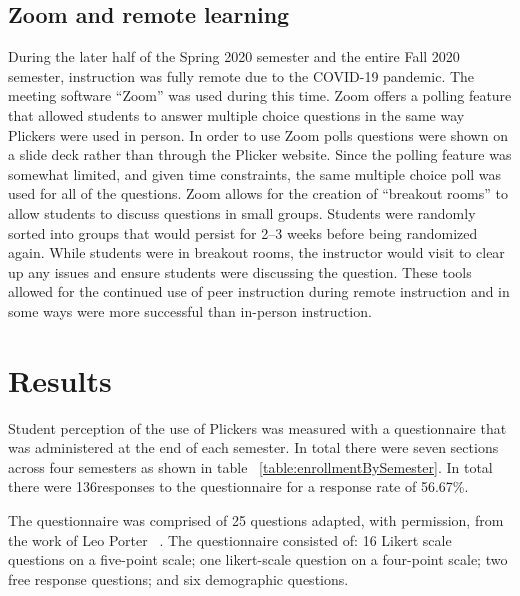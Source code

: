 \documentclass[12pt]{article}
\newcommand\sampleSize{136}
\begin{document}
\subsection{Zoom and remote learning}
During the later half of the Spring 2020 semester and the entire Fall 2020 semester, instruction was fully remote due to the COVID-19 pandemic. The meeting software ``Zoom''  was used during this time. Zoom offers a polling feature that allowed students to answer multiple choice questions in the same way Plickers were used in person. In order to use Zoom polls questions were shown on a slide deck rather than through the Plicker website. Since the polling feature was somewhat limited, and given time constraints, the same multiple choice poll was used for all of the questions. 
Zoom allows for the creation of ``breakout rooms'' to allow students to discuss questions in small groups. Students were randomly sorted into groups that would persist for 2–3 weeks before being randomized again. While students were in breakout rooms, the instructor would visit to clear up any issues and ensure students were discussing the question. These tools allowed for the continued use of peer instruction during remote instruction and in some ways were more successful than in-person instruction.

\section{Results}

Student perception of the use of Plickers was measured with a questionnaire that was administered at the end of each semester. In total there were seven sections across four semesters as shown in table ~\ref{table:enrollmentBySemester}. In total there were \sampleSize responses to the questionnaire for a response rate of 56.67\%.

The questionnaire was comprised of 25 questions adapted, with permission, from the work of Leo Porter ~\cite{porterPeerInstructionStudents2011}. The questionnaire consisted of: 16 Likert scale questions on a five-point scale; one likert-scale question on a four-point scale;  two free response questions; and six demographic questions. 
\end{document}
